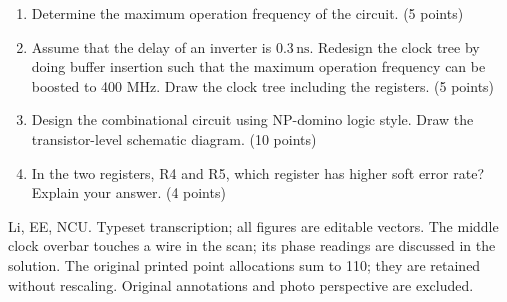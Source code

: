 \documentclass[10pt]{article}
\begin{document}
\begin{enumerate}[label=(\alph*),leftmargin=7mm,itemsep=4pt]
\item Determine the maximum operation frequency of the circuit. (5 points)
\item Assume that the delay of an inverter is $0.3\,\mathrm{ns}$. Redesign the clock tree by doing buffer insertion such that the maximum operation frequency can be boosted to 400 MHz. Draw the clock tree including the registers. (5 points)
\item Design the combinational circuit using NP-domino logic style. Draw the transistor-level schematic diagram. (10 points)
\item In the two registers, R4 and R5, which register has higher soft error rate? Explain your answer. (4 points)
\end{enumerate}
\vfill\small Li, EE, NCU. Typeset transcription; all figures are editable vectors. The middle clock overbar touches a wire in the scan; its phase readings are discussed in the solution. The original printed point allocations sum to 110; they are retained without rescaling. Original annotations and photo perspective are excluded.
\end{document}
